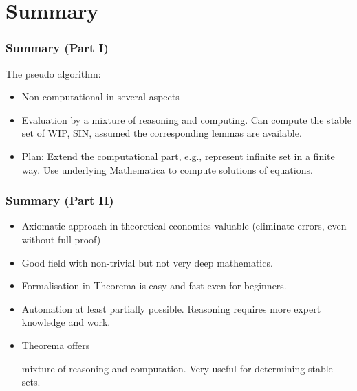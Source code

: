 \documentclass{beamer}
\def\mcolor#1#2{\rule{0ex}{0ex}\color{#1}#2\color{black}{}}
\begin{document}
\section{Summary}
\begin{frame}
\frametitle{Summary (Part I)}

The pseudo algorithm:
\begin{itemize}
\item \mcolor{blue}{Non-computational in several aspects}
\item \mcolor{blue}{Evaluation by a mixture of reasoning and
    computing}.  Can compute the stable set of WIP, SIN, assumed the
  corresponding lemmas are available.
\item \mcolor{blue}{Plan:} Extend the computational part, e.g.,
  represent infinite set in a finite way. Use underlying Mathematica
  to compute solutions of equations.
\end{itemize}
\end{frame}


\begin{frame}
\frametitle{Summary (Part II)}

\begin{itemize}
\item Axiomatic approach in theoretical economics valuable (eliminate errors, even without full proof)
\item Good field with non-trivial but not very deep mathematics.
\item \mcolor{blue}{Formalisation} in Theorema is easy and fast even for beginners.
\item \mcolor{blue}{Automation} at least partially possible. Reasoning requires more expert knowledge and work. 
\item Theorema offers \mcolor{blue}{mixture of reasoning and
    computation}.  Very useful for determining stable sets.
\end{itemize}
\end{frame}
\end{document}
